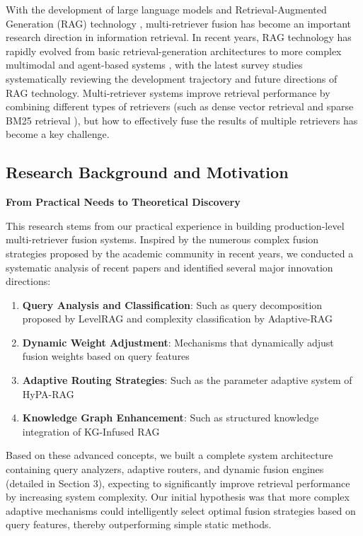 \documentclass[letterpaper]{article} %
\begin{document}
With the development of large language models and Retrieval-Augmented Generation (RAG) technology \cite{lewis2020retrieval}, multi-retriever fusion has become an important research direction in information retrieval. In recent years, RAG technology has rapidly evolved from basic retrieval-generation architectures to more complex multimodal \cite{chen2022multimodal} and agent-based systems \cite{singh2025agentic}, with the latest survey studies \cite{gao2024retrieval} systematically reviewing the development trajectory and future directions of RAG technology. Multi-retriever systems improve retrieval performance by combining different types of retrievers (such as dense vector retrieval \cite{karpukhin2020dense} and sparse BM25 retrieval \cite{robertson2009probabilistic}), but how to effectively fuse the results of multiple retrievers has become a key challenge.

\subsection{Research Background and Motivation}

\textbf{From Practical Needs to Theoretical Discovery}

This research stems from our practical experience in building production-level multi-retriever fusion systems. Inspired by the numerous complex fusion strategies proposed by the academic community in recent years, we conducted a systematic analysis of recent papers and identified several major innovation directions:

\begin{enumerate}
\item \textbf{Query Analysis and Classification}: Such as query decomposition proposed by LevelRAG \cite{jiang2023levelrag} and complexity classification by Adaptive-RAG \cite{jeong2024adaptive}
\item \textbf{Dynamic Weight Adjustment}: Mechanisms that dynamically adjust fusion weights based on query features
\item \textbf{Adaptive Routing Strategies}: Such as the parameter adaptive system of HyPA-RAG \cite{su2024hypa}
\item \textbf{Knowledge Graph Enhancement}: Such as structured knowledge integration of KG-Infused RAG \cite{edge2024kg}
\end{enumerate}

Based on these advanced concepts, we built a complete system architecture containing query analyzers, adaptive routers, and dynamic fusion engines (detailed in Section 3), expecting to significantly improve retrieval performance by increasing system complexity. Our initial hypothesis was that more complex adaptive mechanisms could intelligently select optimal fusion strategies based on query features, thereby outperforming simple static methods.
\end{document}
